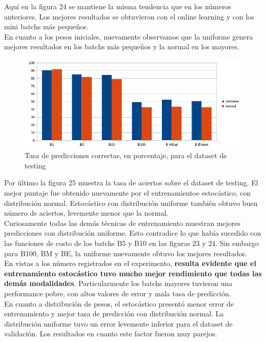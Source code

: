 Aquí en la figura 24 se mantiene la misma tendencia que en los números anteriores. Los mejores resultados se obtuvieron con el online learning y con los mini batchs más pequeños.\\

En cuanto a los pesos iniciales, nuevamente observamos que la uniforme genera mejores resultados en los batchs más pequeños y la normal en los mayores.

\begin{figure}[h]
  \begin{center}
  \includegraphics[scale=0.65]{graficos/distribucion_eficiencia.png}
  \caption{Tasa de predicciones correctas, en porcentaje, para el dataset de testing}
  \end{center}
\end{figure}

Por último la figura 25 muestra la tasa de aciertos sobre el dataset de testing. El mejor puntaje fue obtenido nuevamente por el entrenamientoe estocástico, con distribución normal. Estocástico con distribución uniforme también obtuvo buen número de aciertos, levemente menor que la normal.\\

Curiosamente todas las demás técnicas de entrenamiento muestran mejores predicciones con distribución uniforme. Esto contradice lo que había sucedido con las funciones de costo de los batchs B5 y B10 en las figuras 23 y 24. Sin embargo para B100, BM y BE, la uniforme nuevamente obtuvo los mejores resultados.\\

En vistas a los número registrados en el experimento, \textbf{resulta evidente que el entrenamiento estocástico tuvo mucho mejor rendimiento que todas las demás modalidades}. Particularmente los batchs mayores tuvieron una performance pobre, con altos valores de error y mala tasa de predicción.\\

En cuanto a distribución de pesos, el estocástico presentó menor error de entrenamiento y mejor tasa de predicción con distribución normal. La distribución uniforme tuvo un error levemente inferior para el dataset de validación. Los resultados en cuanto este factor fueron muy parejos.

